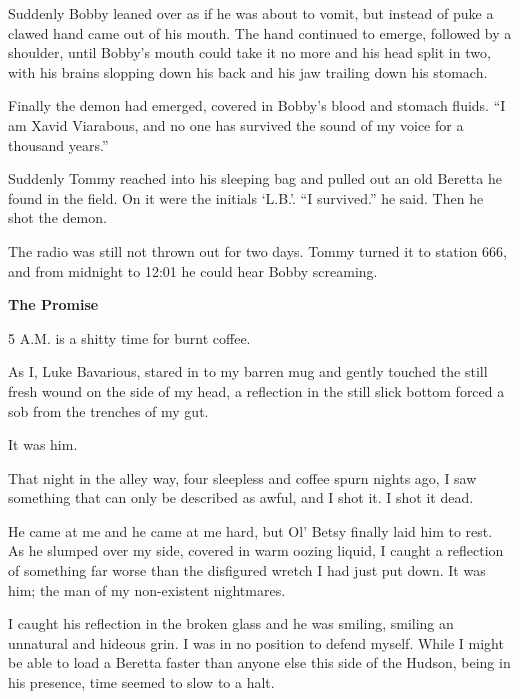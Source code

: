 Suddenly Bobby leaned over as if he was about to vomit, but instead
of puke a clawed hand came out of his mouth. The hand continued to
emerge, followed by a shoulder, until Bobby's mouth could
take it no more and his head split in two, with his brains slopping
down his back and his jaw trailing down his stomach.



Finally the demon had emerged, covered in Bobby's blood and
stomach fluids. ``I am Xavid Viarabous, and no one has
survived the sound of my voice for a thousand years.''



Suddenly Tommy reached into his sleeping bag and pulled out an old
Beretta he found in the field. On it were the initials
`L.B.'. ``I survived.'' he said. Then he shot
the demon.



The radio was still not thrown out for two days. Tommy turned it to
station 666, and from midnight to 12:01 he could hear Bobby
screaming. 
 





{\bf The Promise}



5 A.M. is a shitty time for burnt coffee.



As I, Luke Bavarious, stared in to my barren mug and gently touched
the still fresh wound on the side of my head, a reflection in the
still slick bottom forced a sob from the trenches of my gut.



It was him.



That night in the alley way, four sleepless and coffee spurn nights
ago, I saw something that can only be described as awful, and I
shot it. I shot it dead.



He came at me and he came at me hard, but Ol' Betsy finally
laid him to rest. As he slumped over my side, covered in warm
oozing liquid, I caught a reflection of something far worse than
the disfigured wretch I had just put down. It was him; the man of
my non-existent nightmares.



I caught his reflection in the broken glass and he was smiling,
smiling an unnatural and hideous grin. I was in no position to
defend myself. While I might be able to load a Beretta faster than
anyone else this side of the Hudson, being in his presence, time
seemed to slow to a halt.




